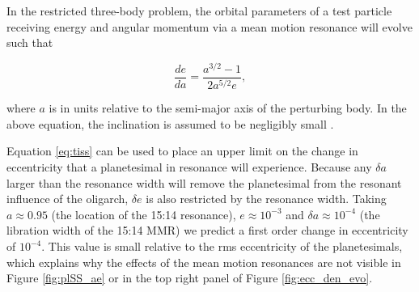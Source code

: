In the restricted three-body problem, the orbital parameters of a test particle receiving energy and angular momentum via a 
mean motion resonance will evolve such that

\begin{equation}\label{eq:tiss}
\frac{de}{da} = \frac{a^{3/2} - 1}{2 a^{5/2} e},
\end{equation}

\noindent where $a$ is in units relative to the semi-major axis of the perturbing body. In the above equation, the inclination is 
assumed to be negligibly small \cite{murray00}.

Equation \ref{eq:tiss} can be used to place an upper limit on the change in eccentricity that a planetesimal in resonance will 
experience. Because any $\delta a$ larger than the resonance width will remove the planetesimal from the resonant influence of 
the oligarch, $\delta e$ is also restricted by the resonance width. Taking $a \approx 0.95$ (the location of the 15:14 resonance), 
$e \approx 10^{-3}$ and $\delta a \approx 10^{-4}$ (the libration width of the 15:14 MMR) we predict a first order change in 
eccentricity of $10^{-4}$. This value is small relative to the rms eccentricity of the planetesimals, which explains why the effects 
of the  mean motion resonances are not visible in Figure \ref{fig:plSS_ae} or in the top right panel of Figure \ref{fig:ecc_den_evo}.

